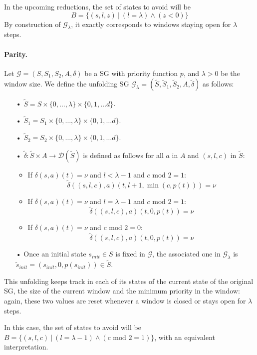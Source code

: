 \documentclass{article}
\newcommand{\CG}{\mathcal{G}}
\newcommand{\SG}{(S, S_1, S_2, A, \delta)}
\newcommand{\CD}{\mathcal{D}}
\theoremstyle{plain}
\begin{document}
In the upcoming reductions, the set of states to avoid will be
$$B = \{ (s, l, z) ~|~(l = \lambda) \wedge (z < 0) \}$$
By construction of $\CG_{\lambda}$, it exactly corresponds to windows staying open for $\lambda$ steps.

\paragraph{Parity.}
Let $\CG = \SG$ be a SG with priority function $p$, and $\lambda > 0$ be the window size. We define the unfolding SG $\CG_{\lambda} = (\tilde{S}, \tilde{S}_1, \tilde{S}_2, A, \tilde{\delta})$ as follows:
\begin{itemize}
\item[•] $\tilde{S} = S \times \{0, \dots, \lambda\} \times \{0, 1, \dots d\}$.
\item[•] $\tilde{S}_1 = S_1 \times \{0, \dots, \lambda\} \times \{0, 1, \dots d\}$.
\item[•] $\tilde{S}_2 = S_2 \times \{0, \dots, \lambda\} \times \{0, 1, \dots d\}$.
\item[•] $\tilde{\delta}: \tilde{S} \times A \rightarrow \CD(\tilde{S})$ is defined as follows for all $a$ in $A$ and $(s, l, c)$ in $\tilde{S}$:
\begin{itemize}
\item If $\delta(s, a)(t) = \nu$ and $l < \lambda - 1$ and $c \text{ mod }2 = 1$:
$$\tilde{\delta}((s, l, c), a)(t, l+1, \min(c, p(t))) = \nu$$
\item If $\delta(s, a)(t) = \nu$ and $l = \lambda - 1$ and $c \text{ mod }2 = 1$:
$$\tilde{\delta}((s, l, c), a)(t, 0, p(t)) = \nu$$
\item If $\delta(s, a)(t) = \nu$ and $c \text{ mod }2 = 0$:
$$\tilde{\delta}((s, l, c), a)(t, 0, p(t)) = \nu$$
\end{itemize}
\item[•] Once an initial state $s_{init} \in S$ is fixed in $\CG$, the associated one in $\CG_{\lambda}$ is $\tilde{s}_{init} = (s_{init}, 0, p(s_{init})) \in \tilde{S}$.
\end{itemize}
This unfolding keeps track in each of its states of the current state of the original SG, the size of the current window and the minimum priority in the window: again, these two values are reset whenever a window is closed or stays open for $\lambda$ steps.

In this case, the set of states to avoid will be $B = \{(s, l, c) ~|~(l = \lambda - 1) \wedge (c \text{ mod }2 = 1)\}$, with an equivalent interpretation.
\end{document}
